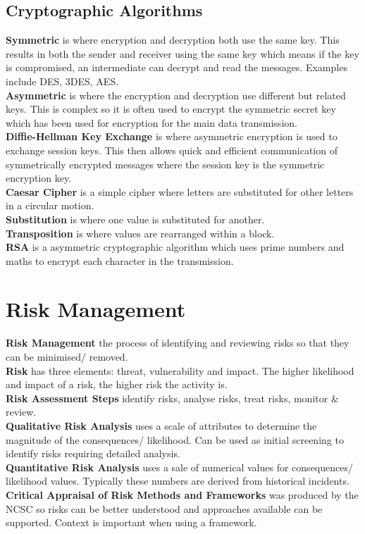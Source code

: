 \documentclass[a4paper,11pt]{article}
\begin{document}
\subsection{Cryptographic Algorithms}
\textbf{Symmetric} is where encryption and decryption both use the same key. This results in both the sender and receiver using the same key which means if the key is compromised, an intermediate can decrypt and read the messages. Examples include DES, 3DES, AES.\\
\textbf{Asymmetric} is where the encryption and decryption use different but related keys. This is complex so it is often used to encrypt the symmetric secret key which has been used for encryption for the main data transmission.\\
\textbf{Diffie-Hellman Key Exchange} is where asymmetric encryption is used to exchange session keys. This then allows quick and efficient communication of symmetrically encrypted messages where the session key is the symmetric encryption key.\\
\textbf{Caesar Cipher} is a simple cipher where letters are substituted for other letters in a circular motion.\\
\textbf{Substitution} is where one value is substituted for another.\\
\textbf{Transposition} is where values are rearranged within a block.\\
\textbf{RSA} is a asymmetric cryptographic algorithm which uses prime numbers and maths to encrypt each character in the transmission. 

\section{Risk Management}
\textbf{Risk Management} the process of identifying and reviewing risks so that they can be minimised/ removed.\\
\textbf{Risk} has three elements: threat, vulnerability and impact. The higher likelihood and impact of a risk, the higher risk the activity is.\\
\textbf{Risk Assessment Steps} identify risks, analyse risks, treat risks, monitor \& review.\\
\textbf{Qualitative Risk Analysis} uses a scale of attributes to determine the magnitude of the consequences/ likelihood. Can be used as initial screening to identify risks requiring detailed analysis.\\
\textbf{Quantitative Risk Analysis} uses a sale of numerical values for consequences/ likelihood values. Typically these numbers are derived from historical incidents.\\
\textbf{Critical Appraisal of Risk Methods and Frameworks} was produced by the NCSC so risks can be better understood and approaches available can be supported. Context is important when using a framework.
\end{document}
